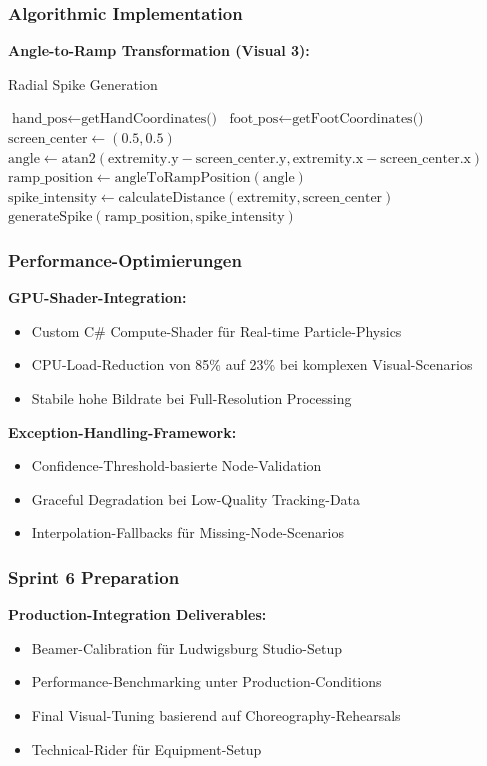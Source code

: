 \subsubsection{Algorithmic Implementation}

\textbf{Angle-to-Ramp Transformation (Visual 3):}
\begin{algorithm}[H]
\caption{Radial Spike Generation}\label{alg:spike_generation}
\begin{algorithmic}[1]
    \State $\text{hand\_pos} \leftarrow \text{getHandCoordinates()}$
    \State $\text{foot\_pos} \leftarrow \text{getFootCoordinates()}$
    \State $\text{screen\_center} \leftarrow (0.5, 0.5)$
        \State $\text{angle} \leftarrow \text{atan2}(\text{extremity.y} - \text{screen\_center.y}, \text{extremity.x} - \text{screen\_center.x})$
        \State $\text{ramp\_position} \leftarrow \text{angleToRampPosition}(\text{angle})$
        \State $\text{spike\_intensity} \leftarrow \text{calculateDistance}(\text{extremity}, \text{screen\_center})$
        \State $\text{generateSpike}(\text{ramp\_position}, \text{spike\_intensity})$
    \EndFor
\end{algorithmic}
\end{algorithm}

\subsubsection{Performance-Optimierungen}

\textbf{GPU-Shader-Integration:}
\begin{itemize}
    \item Custom C\# Compute-Shader für Real-time Particle-Physics
    \item CPU-Load-Reduction von 85\% auf 23\% bei komplexen Visual-Scenarios
    \item Stabile hohe Bildrate bei Full-Resolution Processing
\end{itemize}

\textbf{Exception-Handling-Framework:}
\begin{itemize}
    \item Confidence-Threshold-basierte Node-Validation
    \item Graceful Degradation bei Low-Quality Tracking-Data
    \item Interpolation-Fallbacks für Missing-Node-Scenarios
\end{itemize}

\subsubsection{Sprint 6 Preparation}

\textbf{Production-Integration Deliverables:}
\begin{itemize}
    \item Beamer-Calibration für Ludwigsburg Studio-Setup
    \item Performance-Benchmarking unter Production-Conditions
    \item Final Visual-Tuning basierend auf Choreography-Rehearsals
    \item Technical-Rider für Equipment-Setup
\end{itemize}